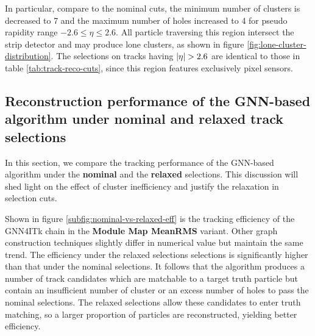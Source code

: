 In particular, compare to the nominal cuts, the minimum number of clusters is decreased to 7 and the maximum number of holes increased to 4 for pseudo rapidity range $-2.6\le \eta \le 2.6$. 
All particle traversing this region intersect the strip detector and may produce lone clusters, as shown in figure \ref{fig:lone-cluster-distribution}.
The selections on tracks having $\abs{\eta} > 2.6$ are identical to those in table \ref{tab:track-reco-cuts}, since this region features exclusively pixel sensors. 

\subsection{Reconstruction performance of the GNN-based algorithm under nominal and relaxed track selections}

In this section, we compare the tracking performance of the GNN-based algorithm under the \textbf{nominal} and the \textbf{relaxed} selections.
This discussion will shed light on the effect of cluster inefficiency and justify the relaxation in selection cuts.

Shown in figure \ref{subfig:nominal-vs-relaxed-eff} is the tracking efficiency of the GNN4ITk chain in the \textbf{Module Map MeanRMS} variant. 
Other graph construction techniques slightly differ in numerical value but maintain the same trend. 
The efficiency under the relaxed selections selections is significantly higher than that under the nominal selections.
It follows that the algorithm produces a number of track candidates which are matchable to a target truth particle but contain an insufficient number of cluster or an excess number of holes to pass the nominal selections. 
The relaxed selections allow these candidates to enter truth matching, so a larger proportion of particles are reconstructed, yielding better efficiency.

